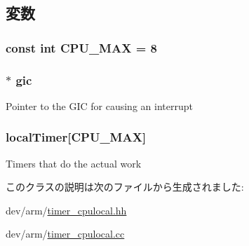 \subsection{変数}
\hypertarget{classCpuLocalTimer_a4b102c882c8ecd5172c3f918fcde9c6d}{
\subsubsection[{CPU\_\-MAX}]{\setlength{\rightskip}{0pt plus 5cm}const int {\bf CPU\_\-MAX} = 8}}
\label{classCpuLocalTimer_a4b102c882c8ecd5172c3f918fcde9c6d}
\hypertarget{classCpuLocalTimer_a2e2266dca56928f63667e994933169ee}{
\subsubsection[{gic}]{$\ast$ {\bf gic}}}
\label{classCpuLocalTimer_a2e2266dca56928f63667e994933169ee}
Pointer to the GIC for causing an interrupt \hypertarget{classCpuLocalTimer_ad9495d6ed4425c81f8f33c7df84a0ada}{
\subsubsection[{localTimer}]{ {\bf localTimer}\mbox{[}{\bf CPU\_\-MAX}\mbox{]}}}
\label{classCpuLocalTimer_ad9495d6ed4425c81f8f33c7df84a0ada}
Timers that do the actual work 

このクラスの説明は次のファイルから生成されました:\begin{DoxyCompactItemize}
\item 
dev/arm/\hyperlink{timer__cpulocal_8hh}{timer\_\-cpulocal.hh}\item 
dev/arm/\hyperlink{timer__cpulocal_8cc}{timer\_\-cpulocal.cc}\end{DoxyCompactItemize}
